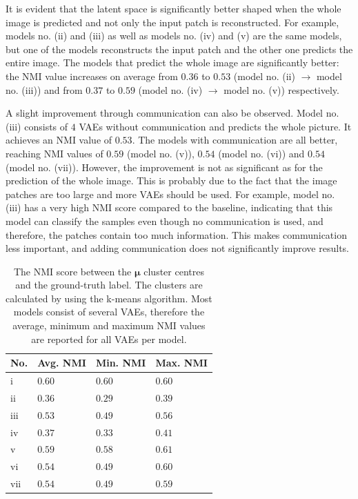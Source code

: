 It is evident that the latent space is significantly better shaped when the whole image is predicted and not only the input patch is reconstructed. For example, models no. (ii) and (iii) as well as models no. (iv) and (v) are the same models, but one of the models reconstructs the input patch and the other one predicts the entire image. The models that predict the whole image are significantly better: the NMI value increases on average from $0.36$ to $0.53$ (model no. (ii) $\rightarrow$ model no. (iii)) and from $0.37$ to $0.59$ (model no. (iv) $\rightarrow$ model no. (v)) respectively.

A slight improvement through communication can also be observed. Model no. (iii) consists of $4$ VAEs without communication and predicts the whole picture. It achieves an NMI value of $0.53$. The models with communication are all better, reaching NMI values of $0.59$ (model no. (v)), $0.54$ (model no. (vi)) and $0.54$ (model no. (vii)). However, the improvement is not as significant as for the prediction of the whole image. This is probably due to the fact that the image patches are too large and more VAEs should be used. For example, model no. (iii) has a very high NMI score compared to the baseline, indicating that this model can classify the samples even though no communication is used, and therefore, the patches contain too much information. This makes communication less important, and adding communication does not significantly improve results.


\begin{table}[h] 
    \centering
	 \begin{tabular}{l l l l}
    	\textbf{No.} & \textbf{Avg. NMI} & \textbf{Min. NMI} & \textbf{Max. NMI}\\
        \hline
		i & $0.60$ & $0.60$ & $0.60$ \\
		ii & $0.36$  & $0.29$ & $0.39$ \\
		iii & $0.53$ & $0.49$ & $0.56$ \\
		iv & $0.37$ & $0.33$ & $0.41$\\
		v & $0.59$ & $0.58$ & $0.61$ \\
		vi & $0.54$ & $0.49$ & $0.60$ \\
		vii & $0.54$ & $0.49$ & $0.59$\\
    \end{tabular}
    \caption[NMI score of different architectures]{The NMI score between the $\boldsymbol{\mu}$ cluster centres and the ground-truth label. The clusters are calculated by using the k-means algorithm. Most models consist of several VAEs, therefore the average, minimum and maximum NMI values are reported for all VAEs per model.}
\end{table}

